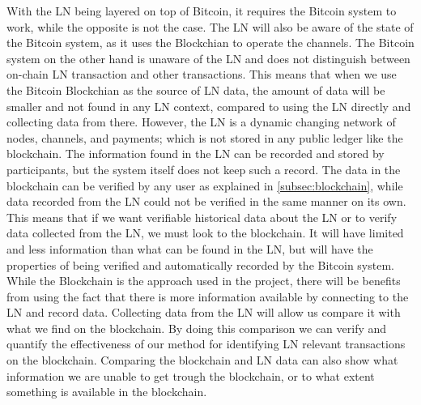 With the LN being layered on top of Bitcoin, it requires the Bitcoin system to work, while the opposite is not the case. The LN will also be aware of the state of the Bitcoin system, as it uses the Blockchian to operate the channels. The Bitcoin system on the other hand is unaware of the LN and does not distinguish between on-chain LN transaction and other transactions. This means that when we use the Bitcoin Blockchian as the source of LN data, the amount of data will be smaller and not found in any LN context, compared to using the LN directly and collecting data from there. However, the LN is a dynamic changing network of nodes, channels, and payments; which is not stored in any public ledger like the blockchain. The information found in the LN can be recorded and stored by participants, but the system itself does not keep such a record. The data in the blockchain can be verified by any user as explained in \cref{subsec:blockchain}, while data recorded from the LN could not be verified in the same manner on its own.
This means that if we want verifiable historical data about the LN or to verify data collected from the LN, we must look to the blockchain. It will have limited and less information than what can be found in the LN, but will have the properties of being verified and automatically recorded by the Bitcoin system.
While the Blockchain is the approach used in the project, there will be benefits from using the fact that there is more information available by connecting to the LN and record data. Collecting data from the LN will allow us compare it with what we find on the blockchain. By doing this comparison we can verify and quantify the effectiveness of our method for identifying LN relevant transactions on the blockchain. Comparing the blockchain and LN data can also show what information we are unable to get trough the blockchain, or to what extent something is available in the blockchain.  
\\


